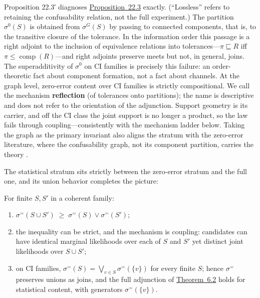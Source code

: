 Proposition 22.3′ diagnoses \hyperlink{stmt:22.3}{Proposition~22.3} exactly. (``Lossless'' refers to retaining the confusability relation, not the full experiment.) The partition \(\sigma^{0}(S)\) is obtained from \(\sigma^{G}(S)\) by passing to connected components, that is, to the transitive closure of the tolerance. In the information order this passage is a right adjoint to the inclusion of equivalence relations into tolerances---\hspace{0pt}\(\pi\sqsubseteq R\) iff \(\pi\le\operatorname{comp}(R)\)---\hspace{0pt}and right adjoints preserve meets but not, in general, joins. The superadditivity of \(\sigma^{0}\) on CI families is precisely this failure: an order-theoretic fact about component formation, not a fact about channels. At the graph level, zero-error content over CI families is strictly compositional. We call the mechanism \textbf{reflection} (of tolerances onto partitions); the name is descriptive and does not refer to the orientation of the adjunction. Support geometry is its carrier, and off the CI class the joint support is no longer a product, so the law fails through coupling---\hspace{0pt}consistently with the mechanism ladder below. Taking the graph as the primary invariant also aligns the stratum with the zero-error literature, where the confusability graph, not its component partition, carries the theory \autocite{shannon1956,lovasz1979}.

The statistical stratum sits strictly between the zero-error stratum and the full one, and its union behavior completes the picture:

\begin{thmplain}

For finite \(S, S'\) in a coherent family:

\begin{enumerate}
\def\labelenumi{\arabic{enumi}.}
\tightlist
\item
  \(\sigma^{=}(S \cup S') \;\ge\; \sigma^{=}(S) \vee \sigma^{=}(S')\);
\item
  the inequality can be strict, and the mechanism is coupling: candidates can have identical marginal likelihoods over each of \(S\) and \(S'\) yet distinct joint likelihoods over \(S \cup S'\);
\item
  on CI families, \(\sigma^{=}(S) = \bigvee_{v \in S} \sigma^{=}(\{v\})\) for every finite \(S\); hence \(\sigma^{=}\) preserves unions as joins, and the full adjunction of \hyperlink{stmt:6.2}{Theorem~6.2} holds for statistical content, with generators \(\sigma^{=}(\{v\})\).
\end{enumerate}
\end{thmplain}

